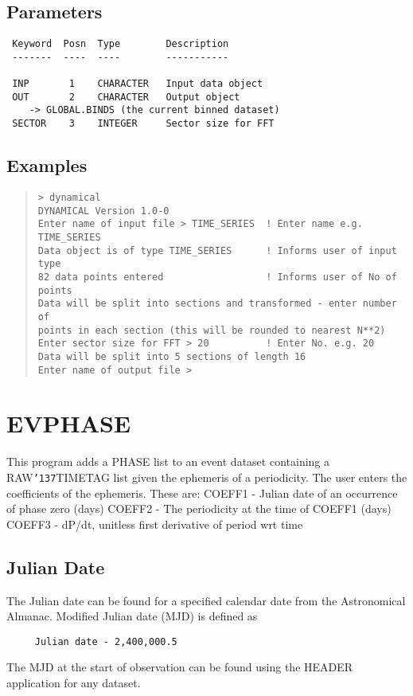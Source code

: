 \documentclass{book}
\renewcommand{\_}{{\tt\char'137}}     %
\begin{document}
\subsection{Parameters}
\begin{verbatim}
 Keyword  Posn  Type        Description
 -------  ----  ----        -----------

 INP       1    CHARACTER   Input data object
 OUT       2    CHARACTER   Output object
    -> GLOBAL.BINDS (the current binned dataset)
 SECTOR    3    INTEGER     Sector size for FFT

\end{verbatim}\subsection{Examples}
\begin{quote}\begin{verbatim}
> dynamical
DYNAMICAL Version 1.0-0
Enter name of input file > TIME_SERIES  ! Enter name e.g. TIME_SERIES
Data object is of type TIME_SERIES      ! Informs user of input type
82 data points entered                  ! Informs user of No of points
Data will be split into sections and transformed - enter number of
points in each section (this will be rounded to nearest N**2)
Enter sector size for FFT > 20          ! Enter No. e.g. 20
Data will be split into 5 sections of length 16
Enter name of output file >
\end{verbatim}\end{quote}
\section{EVPHASE}
This program adds a PHASE list to an event dataset containing
a RAW\_TIMETAG list given the ephemeris of a periodicity.
The user enters the coefficients of the ephemeris. These are:
COEFF1 - Julian date of an occurrence of phase zero (days)
COEFF2 - The periodicity at the time of COEFF1 (days)
COEFF3 - dP/dt, unitless first derivative of period wrt time
\subsection{Julian Date}
The Julian date can be found for a specified calendar date from the
Astronomical Almanac. Modified Julian date (MJD) is defined as
\begin{verbatim}
     Julian date - 2,400,000.5
\end{verbatim}
The MJD at the start of observation can be found using the HEADER
application for any dataset.
\end{document}
